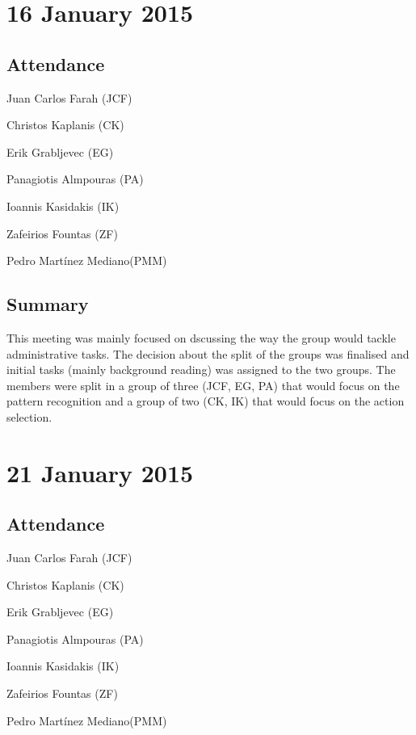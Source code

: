 \documentclass[a4paper,11pt]{article}
\begin{document}
\section*{16 January 2015}
\subsection*{Attendance}
\begin{compactenum}
\item Juan Carlos Farah (JCF)
\item Christos Kaplanis (CK)
\item Erik Grabljevec (EG)
\item Panagiotis Almpouras (PA)
\item Ioannis Kasidakis (IK)
\item Zafeirios Fountas (ZF)
\item Pedro Martínez Mediano(PMM)
\end{compactenum}

\subsection*{Summary}
This meeting was mainly focused on dscussing the way the group would tackle administrative tasks. The decision about the split of the groups was finalised and initial tasks (mainly background reading) was assigned to the two groups. The members were split in a group of three (JCF, EG, PA) that would focus on the pattern recognition and a group of two (CK, IK) that would focus on the action selection.

\maketitle
\section*{21 January 2015}
\subsection*{Attendance}
\begin{compactenum}
\item Juan Carlos Farah (JCF)
\item Christos Kaplanis (CK)
\item Erik Grabljevec (EG)
\item Panagiotis Almpouras (PA)
\item Ioannis Kasidakis (IK)
\item Zafeirios Fountas (ZF)
\item Pedro Martínez Mediano(PMM)
\end{compactenum}
\end{document}
